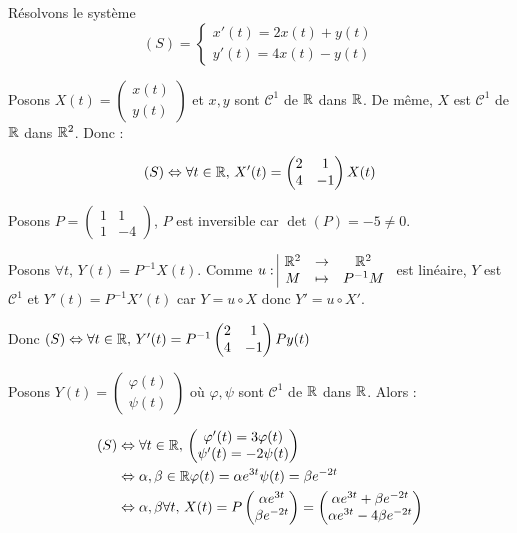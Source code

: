 \documentclass{prepacours}
\begin{document}
\begin{exemple}
    Résolvons le système 
    \[(S) = \begin{cases}
        x'(t) = 2x(t) + y(t) \\
        y'(t) = 4x(t) - y(t)
    \end{cases}\]

    Posons $X(t) = \begin{pmatrix} x(t) \\ y(t) \end{pmatrix}$ et $x, y$ sont $\mathscr C^1$ 
    de $\mathbb{R}$ dans $\mathbb{R}$. De même, $X$ est $\mathscr C^1$ de $\mathbb{R}$ dans $\mathbb{R}^2$. Donc : 

    $$(S) \Leftrightarrow \forall t \in \mathbb{R}, \, X'(t) = \begin{pmatrix} 2 & 1 \\ 4 & -1 \end{pmatrix} X(t)$$

    Posons $P = \begin{pmatrix} 1 & 1 \\ 1 & -4 \end{pmatrix}$, $P$ est inversible car $\det(P) = -5 \neq 0$.

    Posons $\forall t, \, Y(t) = P^{-1}X(t)$. Comme $u: \space \begin{array}{|ccc} \mathbb{R}^2 & \to & \mathbb{R}^2 \\ M & \mapsto & P^{-1}M \end{array}$ est linéaire, 
    $Y$ est $\mathscr C^1$ et $Y'(t) = P^{-1}X'(t)$ car $Y = u \circ X$ donc $Y' = u \circ X'$.

    Donc $(S) \Leftrightarrow \forall t \in \mathbb{R}, \, Y'(t) = P^{-1} \begin{pmatrix} 2 & 1 \\ 4 & -1 \end{pmatrix} P y(t)$

    Posons $Y(t) = \begin{pmatrix} \varphi(t) \\ \psi(t) \end{pmatrix}$ où 
    $\varphi, \psi$ sont $\mathscr C^1$ de $\mathbb{R}$ dans $\mathbb{R}$. Alors : 

    \begin{align*}
        (S) & \Leftrightarrow \forall t \in \mathbb{R}, \, \begin{pmatrix} \varphi'(t)  = 3\varphi(t) \\ \psi'(t) = -2\psi(t) \end{pmatrix}\\
    & \Leftrightarrow \alpha, \beta \in \mathbb{R} \space \varphi(t) = \alpha e^{3t} \space \psi(t) = \beta e^{-2t}\\
    & \Leftrightarrow \alpha, \beta \forall t, \, X(t) = P \begin{pmatrix} \alpha e^{3t} \\ \beta e^{-2t} \end{pmatrix} = \begin{pmatrix} \alpha e^{3t} + \beta e^{-2t} \\ \alpha e^{3t} - 4\beta e^{-2t} \end{pmatrix}
    \end{align*}
    
\end{exemple}
\end{document}
